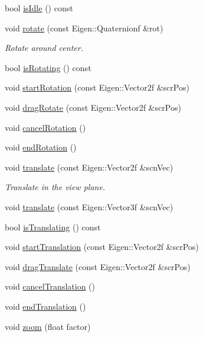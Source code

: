 \begin{DoxyCompactItemize}
bool \hyperlink{class_trackball_a29102c33e22690b2ad3990c516800220}{is\+Idle} () const
\item 
void \hyperlink{class_trackball_aa0dee57906be9ccd12183d0d6e820c3d}{rotate} (const Eigen\+::\+Quaternionf \&rot)
\begin{DoxyCompactList}\small\item\em Rotate around {\ttfamily center}. \end{DoxyCompactList}\item 
bool \hyperlink{class_trackball_a78fa30a8e6ffad74df3488aa3cc009c4}{is\+Rotating} () const
\item 
void \hyperlink{class_trackball_afa938da0cd322cc44cfb9e73add017df}{start\+Rotation} (const Eigen\+::\+Vector2f \&scr\+Pos)
\item 
void \hyperlink{class_trackball_a1dcd5aef16fd43aabfc0099183202437}{drag\+Rotate} (const Eigen\+::\+Vector2f \&scr\+Pos)
\item 
void \hyperlink{class_trackball_afb154690785d4cd7fd54c698649c03e4}{cancel\+Rotation} ()
\item 
void \hyperlink{class_trackball_a1d2f2f29955059d93bb64fe5f83b0afc}{end\+Rotation} ()
\item 
void \hyperlink{class_trackball_aa4f8422c14007f8b27a3b469abe7b1e2}{translate} (const Eigen\+::\+Vector2f \&scn\+Vec)
\begin{DoxyCompactList}\small\item\em Translate in the view plane. \end{DoxyCompactList}\item 
void \hyperlink{class_trackball_a1a40442f993381ffcba90edacb1d1957}{translate} (const Eigen\+::\+Vector3f \&scn\+Vec)
\item 
bool \hyperlink{class_trackball_ab60138170269b87ee0c131a978e98c4b}{is\+Translating} () const
\item 
void \hyperlink{class_trackball_afd0be3e6f9c79903d35af33fb2a6451c}{start\+Translation} (const Eigen\+::\+Vector2f \&scr\+Pos)
\item 
void \hyperlink{class_trackball_ab4271070a39f9c771b526e9e0116894e}{drag\+Translate} (const Eigen\+::\+Vector2f \&scr\+Pos)
\item 
void \hyperlink{class_trackball_a0666f601bf5171b96051074a59a3df73}{cancel\+Translation} ()
\item 
void \hyperlink{class_trackball_ae8ba33700d707ed2621f39bc8fbd3686}{end\+Translation} ()
\item 
void \hyperlink{class_trackball_afe05c150d9bf2301250f8a47080d9a7e}{zoom} (float factor)

\end{DoxyCompactItemize}
